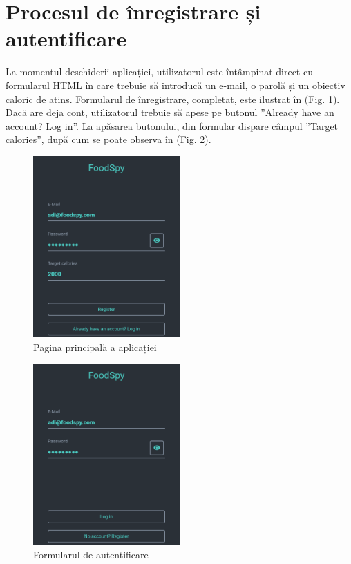 
\section{Procesul de înregistrare și autentificare}
La momentul deschiderii aplicației, utilizatorul este întâmpinat direct cu formularul HTML în care trebuie să introducă un e-mail, o parolă și un obiectiv caloric de atins. Formularul de înregistrare, completat, este ilustrat în (Fig. \ref{fig:71}). Dacă are deja cont, utilizatorul trebuie să apese pe butonul ”Already have an account? Log in”. La apăsarea butonului, din formular dispare câmpul ”Target calories”, după cum se poate observa în (Fig. \ref{fig:72}).

\begin{figure}[!htb]
	\centering
	\includegraphics[width=0.5\textwidth]
	{../LaTeX/Images/App/auth_register.PNG}
	\caption{Pagina principală a aplicației}
	\label{fig:71}
\end{figure}

\begin{figure}[!htb]
	\centering
	\includegraphics[width=0.5\textwidth]
	{../LaTeX/Images/App/auth_login.PNG}
	\caption{Formularul de autentificare}
	\label{fig:72}
\end{figure}


